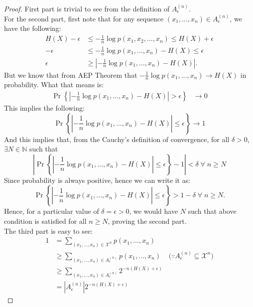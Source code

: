 \documentclass{article}
\theoremstyle{definition}
\theoremstyle{remark}
\theoremstyle{definition}
\theoremstyle{definition}
\theoremstyle{definition}
\DeclarePairedDelimiter\abs{\lvert}{\rvert}
\newcommand{\supp}[1]{\mathcal{#1}}
\newcommand{\tset}[2]{A_{#1}^{(#2)}}
\renewcommand{\abs}[1]{\left \vert #1\right \vert}
\begin{document}
\begin{proof}
	First part is trivial to see from the definition of $ \tset{\epsilon}{n} $. \\
	For the second part, first note that for any sequence $ (x_1,\dots,x_n) \in\tset{\epsilon}{n} $, we have the following:
	\begin{equation*}
		\begin{split}
			H(X)-\epsilon &\le -\frac{1}{n} \log p(x_1,x_2,\dots,x_n) \le H(X)+\epsilon\\
			-\epsilon &\le -\frac{1}{n} \log p(x_1,\dots,x_n) - H(X) \le \epsilon\\
			\epsilon&\ge \abs{-\frac{1}{n} \log p(x_1,\dots,x_n) - H(X)}. 
		\end{split}
	\end{equation*}
But we know that from AEP Theorem that $ -\frac{1}{n} \log p(x_1,\dots,x_n) \to H(X)$ in probability. What that means is:
\begin{equation*}
	\begin{split}
		\Pr\left \{\abs{-\frac{1}{n}\log p(x_1,\dots, x_n)- H(X)} > \epsilon \right \} &\to 0
	\end{split}
\end{equation*}
This implies the following:
\[\Pr\left \{\abs{-\frac{1}{n}\log p(x_1,\dots, x_n)- H(X)} \le \epsilon \right \} \to 1  \]
And this implies that, from the Cauchy's definition of convergence, for all $ \delta > 0 $, $ \exists N\in\mathbb{N} $ such that
\[\abs{\Pr\left \{\abs{-\frac{1}{n}\log p(x_1,\dots, x_n)- H(X)} \le \epsilon \right \} - 1} < \delta \;\forall\; n\ge N\]
Since probability is always positive, hence we can write it as:
\[\Pr\left \{\abs{-\frac{1}{n}\log p(x_1,\dots, x_n)- H(X)} \le \epsilon \right \} > 1-\delta\;\forall \; n\ge N.\]
Hence, for a particular value of $ \delta = \epsilon>0 $, we would have $ N $ such that above condition is satisfied for all $ n\ge N $, proving the second part. \\
The third part is easy to see:
\begin{equation*}
	\begin{split}
		1 &= \sum_{(x_1,\dots,x_n)\in \supp{X}^n} p(x_1,\dots,x_n)\\
		&\ge \sum_{(x_1,\dots,x_n)\in \tset{\epsilon}{n}} p(x_1,\dots, x_n)\;\;\;\;\text{($\because \tset{\epsilon}{n} \subseteq \supp{X}^n$)}\\
		&\ge \sum_{(x_1,\dots,x_n)\in \tset{\epsilon}{n}} 2^{-n(H(X)+\epsilon)}\\
		&= \abs{\tset{\epsilon}{n}} 2^{-n(H(X)+\epsilon)}

\end{split}
\end{equation*}
\end{proof}
\end{document}
